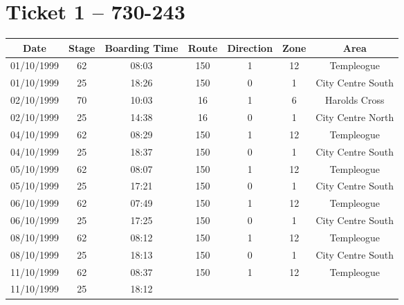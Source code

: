 \newpage




\section{Ticket 1 -- 730-243}
\label{Appendix: Ticket 1 -- 730-243}

\footnotesize{}  \vspace{10pt}

\begin{longtable}[htbp] {ccccccc} \hline
\textbf{Date}& \textbf{Stage}& \textbf{Boarding Time}&

\textbf{Route}   & \textbf{Direction}& \textbf{Zone}&
\textbf{Area} \\
\hline \hline 01/10/1999& 62& 08:03&

150   & 1& 12&
Templeogue \\
\hline 01/10/1999& 25& 18:26&

150   & 0& 1&
City Centre South \\
\hline 02/10/1999& 70& 10:03&

16   & 1& 6&
Harolds Cross \\
\hline 02/10/1999& 25& 14:38&

16   & 0& 1&
City Centre North \\
\hline 04/10/1999& 62& 08:29&

150   & 1& 12&
Templeogue \\
\hline 04/10/1999& 25& 18:37&

150   & 0& 1&
City Centre South \\
\hline 05/10/1999& 62& 08:07&

150   & 1& 12&
Templeogue \\
\hline 05/10/1999& 25& 17:21&

150   & 0& 1&
City Centre South \\
\hline 06/10/1999& 62& 07:49&

150   & 1& 12&
Templeogue \\
\hline 06/10/1999& 25& 17:25&

150   & 0& 1&
City Centre South \\
\hline 08/10/1999& 62& 08:12&

150   & 1& 12&
Templeogue \\
\hline 08/10/1999& 25& 18:13&

150   & 0& 1&
City Centre South \\
\hline 11/10/1999& 62& 08:37&

150   & 1& 12&
Templeogue \\
\hline 11/10/1999& 25& 18:12&


\end{longtable}
